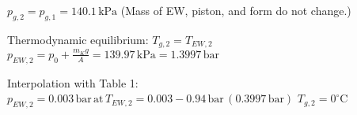 \( p_{g,2} = p_{g,1} = 140.1 \, \text{kPa} \)  
(Mass of EW, piston, and form do not change.)  

Thermodynamic equilibrium: \( T_{g,2} = T_{EW,2} \)  
\( p_{EW,2} = p_0 + \frac{m_K g}{A} = 139.97 \, \text{kPa} = 1.3997 \, \text{bar} \)  

Interpolation with Table 1:  
\( p_{EW,2} = 0.003 \, \text{bar} \, \text{at} \, T_{EW,2} = 0.003 - 0.94 \, \text{bar} \, (0.3997 \, \text{bar}) \)  
\( T_{g,2} = 0^\circ \text{C} \)
